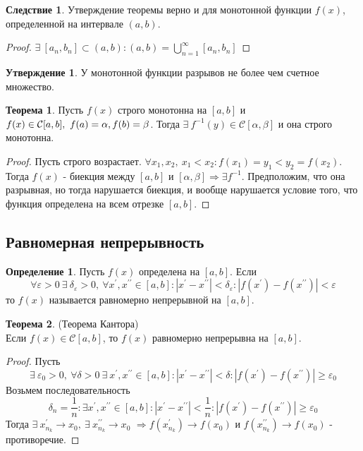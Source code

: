 \documentclass[a4paper, 12pt]{article}
\renewcommand{\epsilon}{\varepsilon}
\theoremstyle{definition}
\newtheorem*{definition}{Определение}
\newtheorem*{theorem}{Теорема}
\newtheorem*{consequense}{Следствие}
\newtheorem*{statement}{Утверждение}
\begin{document}
        \begin{consequense}
            Утверждение теоремы верно и для монотонной функции $f(x)$, определенной на интервале $(a,b)$.
        \end{consequense} 
        \begin{proof}
            $\exists\ [a_n,b_n]\subset (a,b): (a,b)=\bigcup\limits_{n=1}^{\infty}[a_n,b_n]$
        \end{proof}
        \begin{statement}
            У монотонной функции разрывов не более чем счетное множество.
        \end{statement} 
        \begin{theorem}
            Пусть $f(x)$ строго монотонна на $[a,b]$ и $f(x)\in\mathcal{C}[a,b],\ f(a)=\alpha,\\
            f(b)=\beta$. Тогда $\exists\ f^{-1}(y)\in\mathcal{C}[\alpha,\beta]$ и она строго монотонна. 
        \end{theorem} 
        \begin{proof}
            Пусть строго возрастает. $\forall x_1,x_2,\ x_1<x_2: f(x_1)=y_1<y_2=f(x_2)$. Тогда $f(x)$ - биекция между $[a,b]$ и $[\alpha,\beta] \Rightarrow \exists f^{-1}$. Предположим, что она разрывная, но тогда нарушается биекция, и вообще нарушается условие того, что функция определена на всем отрезке $[a,b]$.
        \end{proof} 
    \subsection{Равномерная непрерывность}
        \begin{definition}
            Пусть $f(x)$ определена на $[a,b]$. Если 
            \[\forall \epsilon>0\ \exists\ \delta_{\epsilon}>0,\ \forall x^{\prime}, x^{\prime\prime}\in [a,b]: |x^{\prime}-x^{\prime\prime}|<\delta_{\epsilon}: |f(x^{\prime})-f(x^{\prime\prime})|<\epsilon\] 
            то $f(x)$ называется равномерно непрерывной на $[a,b]$.
        \end{definition} 
        \begin{theorem} (Теорема Кантора)\\
            Если $f(x)\in \mathcal{C}[a,b]$, то $f(x)$ равномерно непрерывна на $[a,b]$.
        \end{theorem} 
        \begin{proof}
            Пусть 
            \[\exists\ \epsilon_0>0,\ \forall \delta>0\ \exists\ x^{\prime}, x^{\prime\prime}\in [a,b]: |x^{\prime}-x^{\prime\prime}|<\delta: |f(x^{\prime})-f(x^{\prime\prime})|\geq \epsilon_0\] 
            Возьмем последовательность 
            \[\delta_n=\frac{1}{n}: \exists x^{\prime},x^{\prime\prime}\in [a,b]: |x^{\prime}-x^{\prime\prime}|<\frac{1}{n}: |f(x^{\prime})-f(x^{\prime\prime})|\geq \epsilon_0\] 
            Тогда $\exists\ x_{n_k}^{\prime}\to x_0,\ \exists\ x_{n_k}^{\prime\prime}\to x_0$ $\Rightarrow f(x_{n_k}^{\prime})\to f(x_0)$ и $f(x_{n_k}^{\prime\prime})\to f(x_0)$ - противоречие.
        \end{proof}
\end{document}
